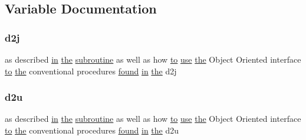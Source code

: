 \subsection{Variable Documentation}
\mbox{\label{M__time_83_8txt_a8de06533a8f0f8b49b9398aeda11296b}} 
\subsubsection{\texorpdfstring{d2j}{d2j}}
{\footnotesize\ttfamily as described \hyperlink{M__journal_83_8txt_afce72651d1eed785a2132bee863b2f38}{in} \hyperlink{M__stopwatch_83_8txt_a0f266597de2e57eb3aa964927bb30e14}{the} \hyperlink{M__stopwatch_83_8txt_acfbcff50169d691ff02d4a123ed70482}{subroutine} as well as how \hyperlink{M__stopwatch_83_8txt_a97209fd3e34ef701c0a9734280779cbb}{to} \hyperlink{intro__blas1_83_8txt_a04fa2694d85f67a675bb3f45f7241f48}{use} \hyperlink{M__stopwatch_83_8txt_a0f266597de2e57eb3aa964927bb30e14}{the} Object Oriented interface \hyperlink{M__stopwatch_83_8txt_a97209fd3e34ef701c0a9734280779cbb}{to} \hyperlink{M__stopwatch_83_8txt_a0f266597de2e57eb3aa964927bb30e14}{the} conventional procedures \hyperlink{what__overview_81_8txt_ac0a3098bb3d5de70ed1c81da8bfd2599}{found} \hyperlink{M__journal_83_8txt_afce72651d1eed785a2132bee863b2f38}{in} \hyperlink{M__stopwatch_83_8txt_a0f266597de2e57eb3aa964927bb30e14}{the} d2j}

\mbox{\label{M__time_83_8txt_ab56b0f002a88dac7ff0ec59238e7aad2}} 
\subsubsection{\texorpdfstring{d2u}{d2u}}
{\footnotesize\ttfamily as described \hyperlink{M__journal_83_8txt_afce72651d1eed785a2132bee863b2f38}{in} \hyperlink{M__stopwatch_83_8txt_a0f266597de2e57eb3aa964927bb30e14}{the} \hyperlink{M__stopwatch_83_8txt_acfbcff50169d691ff02d4a123ed70482}{subroutine} as well as how \hyperlink{M__stopwatch_83_8txt_a97209fd3e34ef701c0a9734280779cbb}{to} \hyperlink{intro__blas1_83_8txt_a04fa2694d85f67a675bb3f45f7241f48}{use} \hyperlink{M__stopwatch_83_8txt_a0f266597de2e57eb3aa964927bb30e14}{the} Object Oriented interface \hyperlink{M__stopwatch_83_8txt_a97209fd3e34ef701c0a9734280779cbb}{to} \hyperlink{M__stopwatch_83_8txt_a0f266597de2e57eb3aa964927bb30e14}{the} conventional procedures \hyperlink{what__overview_81_8txt_ac0a3098bb3d5de70ed1c81da8bfd2599}{found} \hyperlink{M__journal_83_8txt_afce72651d1eed785a2132bee863b2f38}{in} \hyperlink{M__stopwatch_83_8txt_a0f266597de2e57eb3aa964927bb30e14}{the} d2u}

